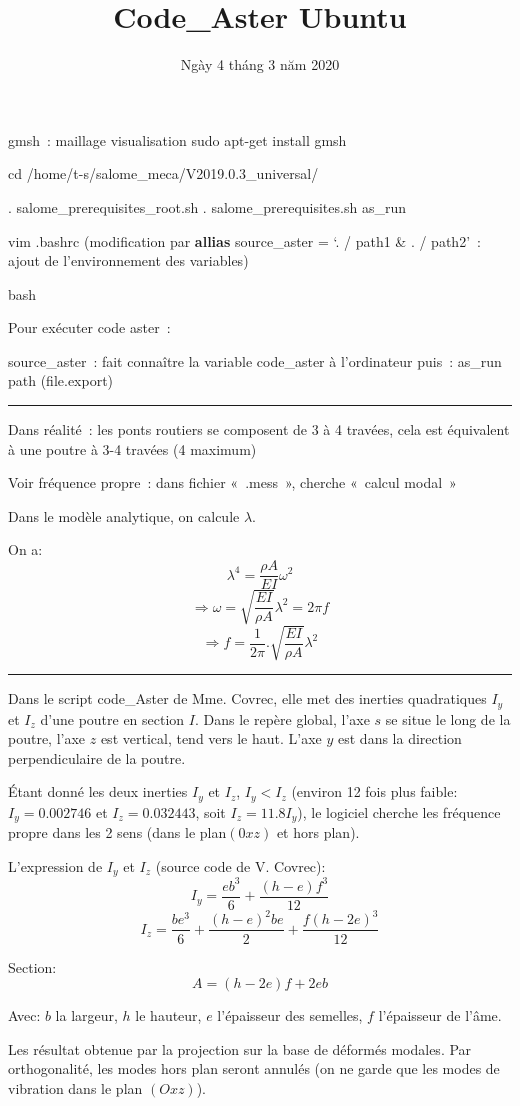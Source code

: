 \documentclass[12pt]{article}
\title{Code\_Aster Ubuntu}
\date{Ngày 4 tháng 3 năm 2020}
\begin{document}
	\maketitle

	gmsh : maillage visualisation
	sudo apt-get install gmsh
	
	cd /home/t-s/salome\_meca/V2019.0.3\_universal/
	
	. salome\_prerequisites\_root.sh 
	. salome\_prerequisites.sh 
	as\_run 
	
	vim .bashrc
	(modification par \textbf{allias} source\_aster = ‘. / path1 \& . / path2’ : ajout de l’environnement des variables)
	
	bash
	
	Pour exécuter code aster :
	
	source\_aster : fait connaître la variable code\_aster à l’ordinateur
	puis :
	as\_run path (file.export) \\
	
	\noindent\rule{18.5cm}{0.4pt}
	\linebreak
	
	Dans réalité : les ponts routiers se composent de 3 à 4 travées, cela est équivalent à une poutre à 3-4 travées (4 maximum)
	
	Voir fréquence propre : dans fichier « .mess », cherche « calcul modal »
	
	Dans le modèle analytique, on calcule $\lambda$.
	
	On a:
	$$\lambda^4 = \frac{\rho A}{EI} \omega^2$$
	$$\Rightarrow \omega = \sqrt{\frac{EI}{\rho A}} \lambda ^2 = 2 \pi f $$
	$$\Rightarrow f = \frac{1}{2 \pi}.\sqrt{\frac{EI}{\rho A}} \lambda ^2 $$
	
	\noindent\rule{18.5cm}{0.4pt}
	\linebreak
	
	Dans le script code\_Aster de Mme. Covrec, elle met des inerties quadratiques $I_y$ et $I_z$ d'une poutre en section $I$. Dans le repère global, l'axe $s$ se situe le long de la poutre, l'axe $z$ est vertical, tend vers le haut. L'axe $y$ est dans la direction perpendiculaire de la poutre.
	
	Étant donné les deux inerties $I_y$ et $I_z$, $I_y < I_z$ (environ 12 fois plus faible: $I_y = 0.002746$ et $I_z = 0.032443$, soit $I_z = 11.8 I_y$), le logiciel cherche les fréquence propre dans les 2 sens (dans le plan$(0xz)$ et hors plan).
	
	L'expression de $I_y$ et $I_z$ (source code de V. Covrec):
	$$I_y = \frac{eb^3}{6} + \frac{(h-e)f^3}{12} $$
	$$I_z = \frac{be^3}{6} + \frac{(h-e)^2be}{2} +\frac{f(h-2e)^3}{12}$$
	
	Section:
	$$A = (h-2e)f + 2eb$$
	
	Avec:
	$b$ la largeur, $h$ le hauteur, $e$ l'épaisseur des semelles, $f$ l'épaisseur de l'âme.
	
	Les résultat obtenue par la projection sur la base de déformés modales. Par orthogonalité, les modes hors plan seront annulés (on ne garde que les modes de vibration dans le plan $(Oxz)$).
	
	
\end{document}

